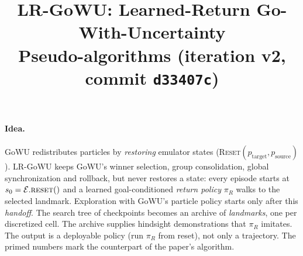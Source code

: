 \documentclass[10pt]{article}
\title{LR-GoWU: Learned-Return Go-With-Uncertainty\\[2pt]\large Pseudo-algorithms (iteration v2, commit \texttt{d33407c})}
\date{}
\newcommand{\cE}{\mathcal{E}}
\newcommand{\proc}[1]{\textsc{#1}}
\begin{document}
\maketitle
\vspace{-2.5em}

\paragraph{Idea.} GoWU \cite{gowu} redistributes particles by \emph{restoring} emulator states
(\proc{Reset}$(p_\text{target}, p_\text{source})$). LR-GoWU keeps GoWU's winner selection, group
consolidation, global synchronization and rollback, but never restores a state: every episode starts at
$s_0 = \cE.\textsc{reset}()$ and a learned goal-conditioned \emph{return policy} $\pi_R$ walks to the selected
landmark. Exploration with GoWU's particle policy starts only after this \emph{handoff}. The search tree of
checkpoints becomes an archive of \emph{landmarks}, one per discretized cell. The archive supplies
hindsight demonstrations that $\pi_R$ imitates. The output is a deployable policy (run $\pi_R$ from reset),
not only a trajectory. The primed numbers mark the counterpart of the paper's algorithm.
\end{document}
